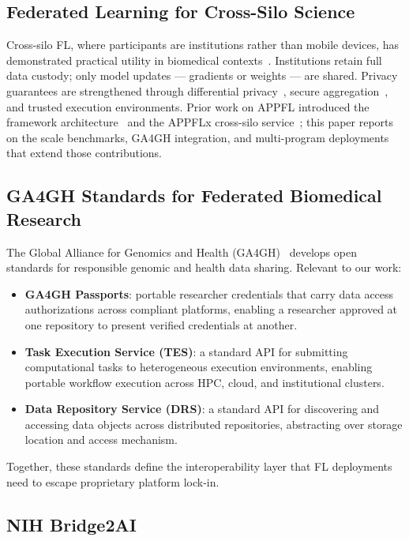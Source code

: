 \documentclass[conference]{IEEEtran}
\begin{document}
\subsection{Federated Learning for Cross-Silo Science}

Cross-silo FL, where participants are institutions rather than mobile devices, has demonstrated practical utility in biomedical contexts~\cite{rieke2020future, dayan2021federated}. Institutions retain full data custody; only model updates — gradients or weights — are shared. Privacy guarantees are strengthened through differential privacy~\cite{dwork2014}, secure aggregation~\cite{bonawitz2017}, and trusted execution environments. Prior work on APPFL introduced the framework architecture~\cite{ryu2022appfl} and the APPFLx cross-silo service~\cite{li2023appflx}; this paper reports on the scale benchmarks, GA4GH integration, and multi-program deployments that extend those contributions.

\subsection{GA4GH Standards for Federated Biomedical Research}

The Global Alliance for Genomics and Health (GA4GH)~\cite{ga4gh} develops open standards for responsible genomic and health data sharing. Relevant to our work:
\begin{itemize}
    \item \textbf{GA4GH Passports}: portable researcher credentials that carry data access authorizations across compliant platforms, enabling a researcher approved at one repository to present verified credentials at another.
    \item \textbf{Task Execution Service (TES)}: a standard API for submitting computational tasks to heterogeneous execution environments, enabling portable workflow execution across HPC, cloud, and institutional clusters.
    \item \textbf{Data Repository Service (DRS)}: a standard API for discovering and accessing data objects across distributed repositories, abstracting over storage location and access mechanism.
\end{itemize}
Together, these standards define the interoperability layer that FL deployments need to escape proprietary platform lock-in.

\subsection{NIH Bridge2AI}
\end{document}
